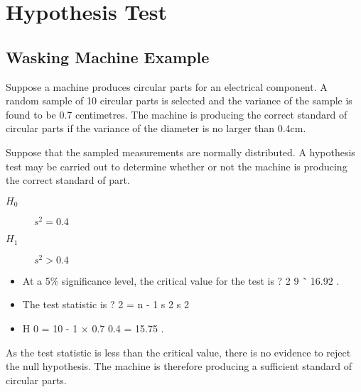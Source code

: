 
\section{Hypothesis Test}
\subsection{Wasking Machine Example}%
Suppose a machine produces circular parts for an electrical component. A random sample of 10 circular parts is selected and the variance of the sample is found to be 0.7 centimetres. The machine is producing the correct standard of circular parts if the variance of the diameter is no larger than 0.4cm.

Suppose that the sampled measurements are normally distributed. A hypothesis test may be carried out to determine whether or not the machine is producing the correct standard of part.

\begin{description}
\item[$H_0$] $s^2=0.4$
\item[$H_1$] $s^2>0.4$
\end{description} 

\begin{itemize}
\item At a 5\% significance level, the critical value for the test is ? 2 9 ˜ 16.92 . 
\item The test statistic is ? 2 = n - 1 s 2 s 2 
\item H 0 = 10 - 1 × 0.7 0.4 = 15.75 .
\end{itemize}




As the test statistic is less than the critical value, there is no evidence to reject the null hypothesis. The machine is therefore producing a sufficient standard of circular parts.